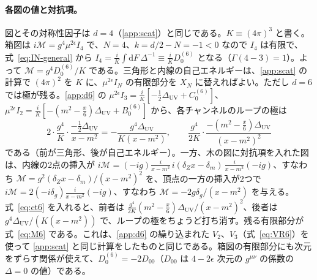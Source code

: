 \documentclass[a4paper,10pt]{ltjsarticle}
\newcommand{\dd}{\mathrm{d}}
\begin{document}
\paragraph{各図の値と対抗項。}図とその対称性因子は $d=4$（\ref{app:scat}）と同じである。$K\equiv(4\pi)^3$ と書く。箱図は $i\mathcal{M}=g^4\mu^{2\epsilon}I_4$ で、$N=4$、$k=d/2-N=-1<0$ なので $I_4$ は有限で、式~\eqref{eq:IN-general} から $I_4=\frac{i}{K}\int\dd F\,\Delta^{-1}\equiv\frac iKD_0^{(6)}$ となる（$\Gamma(4-3)=1$）。よって $\mathcal{M}=g^4D_0^{(6)}/K$ である。三角形と内線の自己エネルギーは、\ref{app:scat} の計算で $(4\pi)^2$ を $K$ に、$\mu^{2\epsilon}I_N$ の有限部分を $X_N$ に替えればよい。ただし $d=6$ では極が残る。\ref{app:d6} の $\mu^{2\epsilon}I_3=\frac iK[-\frac12\Delta_{\mathrm{UV}}+C_0^{(6)}]$、$\mu^{2\epsilon}I_2=\frac iK[-(m^2-\frac{x}{6})\Delta_{\mathrm{UV}}+B_0^{(6)}]$ から、各チャンネルのループの極は
\begin{equation*}
2\cdot\frac{g^4}{K}\cdot\frac{-\frac12\Delta_{\mathrm{UV}}}{x-m^2}=-\frac{g^4\Delta_{\mathrm{UV}}}{K(x-m^2)},\qquad
\frac{g^4}{2K}\cdot\frac{-(m^2-\frac x6)\Delta_{\mathrm{UV}}}{(x-m^2)^2}
\end{equation*}
である（前が三角形、後が自己エネルギー）。一方、木の図に対抗項を入れた図は、内線の2点の挿入が $i\mathcal{M}=(-ig)\frac{i}{x-m^2}\,i(\delta_Zx-\delta_m)\,\frac{i}{x-m^2}(-ig)$、すなわち $\mathcal{M}=g^2(\delta_Zx-\delta_m)/(x-m^2)^2$ を、頂点の一方の挿入が2つで $i\mathcal{M}=2(-i\delta_g)\frac{i}{x-m^2}(-ig)$、すなわち $\mathcal{M}=-2g\delta_g/(x-m^2)$ を与える。式~\eqref{eq:ct6} を入れると、前者は $\frac{g^4}{2K}(m^2-\frac x6)\Delta_{\mathrm{UV}}/(x-m^2)^2$、後者は $g^4\Delta_{\mathrm{UV}}/(K(x-m^2))$ で、ループの極をちょうど打ち消す。残る有限部分が式~\eqref{eq:M6} である。これは、\ref{app:d6} の繰り込まれた $V_2$、$V_3$（式~\eqref{eq:VR6}）を使って \ref{app:scat} と同じ計算をしたものと同じである。箱図の有限部分にも次元をずらす関係が使えて、$D_0^{(6)}=-2D_{00}$（$D_{00}$ は $4-2\epsilon$ 次元の $g^{\mu\nu}$ の係数の $\Delta=0$ の値）である。
\end{document}
